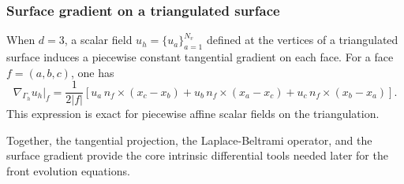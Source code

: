 \documentclass{article}
\begin{document}
\subsubsection{Surface gradient on a triangulated surface}

When $d=3$, a scalar field $u_h=\{u_a\}_{a=1}^{N_v}$ defined at the vertices of a
triangulated surface induces a piecewise constant tangential gradient on each face.
For a face $f=(a,b,c)$, one has
\begin{equation}
\nabla_{\Gamma_h} u_h \big|_f
=
\frac{1}{2|f|}
\left[
u_a\, n_f\times(x_c-x_b)
+
u_b\, n_f\times(x_a-x_c)
+
u_c\, n_f\times(x_b-x_a)
\right].
\label{eq:surface_gradient}
\end{equation}
This expression is exact for piecewise affine scalar fields on the triangulation.

Together, the tangential projection, the Laplace-Beltrami operator, and the
surface gradient provide the core intrinsic differential tools needed later for the front evolution equations.
\end{document}
